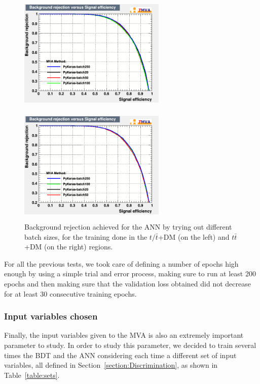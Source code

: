 \documentclass[a4paper, 10pt, openright]{report}
\begin{document}
\begin{appendices}
\begin{figure}[htbp]
\centering
\begin{minipage}[b]{.48\textwidth}
\includegraphics[width=7cm, height=5.7cm]{figs/ANN_batch_ST.png}
\end{minipage}\hfill
\begin{minipage}[b]{.48\textwidth}
\includegraphics[width=7cm, height=5.7cm]{figs/ANN_batch_TTbar.png}
\end{minipage} \hfill
\caption{Background rejection achieved for the \ac{ANN} by trying out different batch sizes, for the training done in the $t/ \bar t$+DM (on the left) and $t \bar t$+DM (on the right) regions.}
\label{fig:optBatch}
\end{figure}

For all the previous tests, we took care of defining a number of epochs high enough by using a simple trial and error process, making sure to run at least 200 epochs and then making sure that the validation loss obtained did not decrease for at least 30 consecutive training epochs.  

\subsubsection{Input variables chosen}

Finally, the input variables given to the \ac{MVA} is also an extremely important parameter to study. In order to study this parameter, we decided to train several times the \ac{BDT} and the \ac{ANN} considering each time a different set of input variables, all defined in Section~\ref{section:Discrimination}, as shown in Table~\ref{table:sets}. %


\end{appendices}
\end{document}
